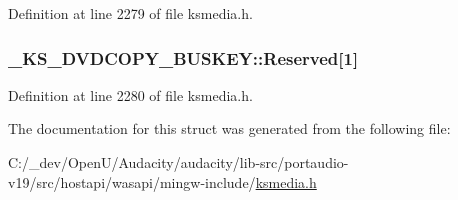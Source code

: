 Definition at line 2279 of file ksmedia.\+h.

\subsubsection[{\texorpdfstring{Reserved}{Reserved}}]{ \+\_\+\+K\+S\+\_\+\+D\+V\+D\+C\+O\+P\+Y\+\_\+\+B\+U\+S\+K\+E\+Y\+::\+Reserved\mbox{[}1\mbox{]}}\hypertarget{struct___k_s___d_v_d_c_o_p_y___b_u_s_k_e_y_ac66decf2c289c84038930cc6c9358b12}{}\label{struct___k_s___d_v_d_c_o_p_y___b_u_s_k_e_y_ac66decf2c289c84038930cc6c9358b12}


Definition at line 2280 of file ksmedia.\+h.



The documentation for this struct was generated from the following file\+:\begin{DoxyCompactItemize}
\item 
C\+:/\+\_\+dev/\+Open\+U/\+Audacity/audacity/lib-\/src/portaudio-\/v19/src/hostapi/wasapi/mingw-\/include/\hyperlink{ksmedia_8h}{ksmedia.\+h}\end{DoxyCompactItemize}
